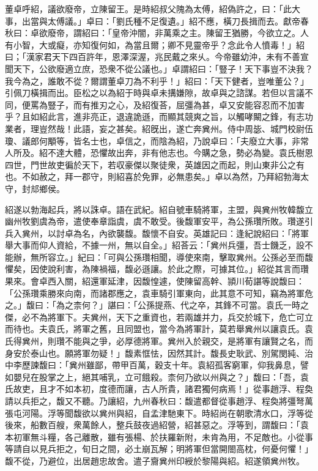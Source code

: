 \begin{pinyinscope}
董卓呼紹，議欲廢帝，立陳留王。是時紹叔父隗為太傅，紹偽許之，曰：「此大事，出當與太傅議。」卓曰：「劉氏種不足復遺。」紹不應，橫刀長揖而去。獻帝春秋曰：卓欲廢帝，謂紹曰：「皇帝沖闇，非萬乘之主。陳留王猶勝，今欲立之。人有小智，大或癡，亦知復何如，為當且爾；卿不見靈帝乎？念此令人憤毒！」紹曰；「漢家君天下四百許年，恩澤深渥，兆民戴之來乆。今帝雖幼沖，未有不善宣聞天下，公欲廢適立庶，恐衆不從公議也。」卓謂紹曰：「豎子！天下事豈不決我？我今為之，誰敢不從？爾謂董卓刀為不利乎！」紹曰：「天下健者，豈唯董公？」引佩刀橫揖而出。臣松之以為紹于時與卓未搆嫌隙，故卓與之諮謀。若但以言議不同，便罵為豎子，而有推刃之心，及紹復荅，屈彊為甚，卓又安能容忍而不加害乎？且如紹此言，進非亮正，退違詭遜，而顯其競爽之旨，以觸哮闞之鋒，有志功業者，理豈然哉！此語，妄之甚矣。紹旣出，遂亡奔兾州。侍中周毖、城門校尉伍瓊、議郎何顒等，皆名士也，卓信之，而陰為紹，乃說卓曰：「夫廢立大事，非常人所及。紹不達大體，恐懼故出奔，非有他志也。今購之急，勢必為變。袁氏樹恩四世，門世故吏徧於天下，若収豪傑以聚徒衆，英雄因之而起，則山東非公之有也。不如赦之，拜一郡守，則紹喜於免罪，必無患矣。」卓以為然，乃拜紹勃海太守，封邟鄉侯。

紹遂以勃海起兵，將以誅卓。語在武紀。紹自號車騎將軍，主盟，與兾州牧韓馥立幽州牧劉虞為帝，遣使奉章詣虞，虞不敢受。後馥軍安平，為公孫瓚所敗。瓚遂引兵入兾州，以討卓為名，內欲襲馥。馥懷不自安。英雄記曰：逢紀說紹曰：「將軍舉大事而仰人資給，不據一州，無以自全。」紹荅云：「兾州兵彊，吾士饑乏，設不能辦，無所容立。」紀曰：「可與公孫瓚相聞，導使來南，擊取兾州。公孫必至而馥懼矣，因使說利害，為陳禍福，馥必遜讓。於此之際，可據其位。」紹從其言而瓚果來。會卓西入關，紹還軍延津，因馥惶遽，使陳留高幹、頴川荀諶等說馥曰：「公孫瓚乘勝來向南，而諸郡應之，袁車騎引軍東向，此其意不可知，竊為將軍危之。」馥曰：「為之柰何？」諶曰：「公孫提燕、代之卒，其鋒不可當。袁氏一時之傑，必不為將軍下。夫兾州，天下之重資也，若兩雄并力，兵交於城下，危亡可立而待也。夫袁氏，將軍之舊，且同盟也，當今為將軍計，莫若舉兾州以讓袁氏。袁氏得兾州，則瓚不能與之爭，必厚德將軍。兾州入於親交，是將軍有讓賢之名，而身安於泰山也。願將軍勿疑！」馥素恇怯，因然其計。馥長史耿武、別駕閔純、治中李歷諫馥曰：「兾州雖鄙，帶甲百萬，穀支十年。袁紹孤客窮軍，仰我鼻息，譬如嬰兒在股掌之上，絕其哺乳，立可餓殺。柰何乃欲以州與之？」馥曰：「吾，袁氏故吏，且才不如本初，度德而讓，古人所貴，諸君獨何病焉！」從事趙浮、程奐請以兵拒之，馥又不聽。乃讓紹，九州春秋曰：馥遣都督從事趙浮、程奐將彊弩萬張屯河陽。浮等聞馥欲以兾州與紹，自孟津馳東下。時紹尚在朝歌清水口，浮等從後來，船數百艘，衆萬餘人，整兵鼓夜過紹營，紹甚惡之。浮等到，謂馥曰：「袁本初軍無斗糧，各己離散，雖有張楊、於扶羅新附，未肯為用，不足敵也。小從事等請自以見兵拒之，旬日之間，必土崩瓦解；明將軍但當開閤高枕，何憂何懼！」馥不從，乃避位，出居趙忠故舍。遣子齎兾州印綬於黎陽與紹。紹遂領兾州牧。


\end{pinyinscope}
